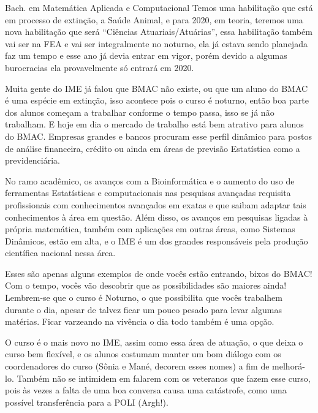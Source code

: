 \begin{subsecao}{Bach. em Matemática Aplicada e Computacional}
Temos uma habilitação que está em processo de extinção, a Saúde Animal, e para
2020, em teoria, teremos uma nova habilitação que será “Ciências Atuariais/Atuárias”, essa
habilitação também vai ser na FEA e vai ser integralmente no noturno, ela já
estava sendo planejada faz um tempo e esse ano já devia entrar em vigor, porém
devido a algumas burocracias ela provavelmente só entrará em 2020.

Muita gente do IME já falou que BMAC não existe, ou que um aluno do BMAC é uma
espécie em extinção, isso acontece pois o curso é noturno, então boa parte
dos alunos começam a trabalhar conforme o tempo passa, isso se já não trabalham.
E hoje em dia o mercado de trabalho está bem atrativo para alunos do BMAC.
Empresas grandes e bancos procuram esse perfil dinâmico para postos de análise
financeira, crédito ou ainda em áreas de previsão Estatística como a
previdenciária.

No ramo acadêmico, os avanços com a Bioinformática e o aumento do uso de
ferramentas Estatísticas e computacionais nas pesquisas avançadas requisita
profissionais com conhecimentos avançados em exatas e que saibam adaptar tais
conhecimentos à área em questão. Além disso, os avanços em pesquisas ligadas à
própria matemática, também com aplicações em outras áreas, como Sistemas
Dinâmicos, estão em alta, e o IME é um dos grandes responsáveis pela produção
científica nacional nessa área.

Esses são apenas alguns exemplos de onde vocês estão entrando, bixos do BMAC! Com o tempo,
vocês vão descobrir que as possibilidades são maiores ainda! Lembrem-se que o
curso é Noturno, o que possibilita que vocês trabalhem durante o dia, apesar de talvez
ficar um pouco pesado para levar algumas matérias. Ficar varzeando na vivência o dia todo
também é uma opção.

O curso é o mais novo no IME, assim como essa área de atuação, o que
deixa o curso bem flexível, e os alunos costumam manter um bom diálogo
com os coordenadores do curso (Sônia e Mané, decorem esses nomes) a fim de melhorá-lo.
Também não se intimidem em falarem com os veteranos que fazem esse curso, pois às
vezes a falta de uma boa conversa causa uma catástrofe, como uma possível
transferência para a POLI (Argh!).

\end{subsecao}
